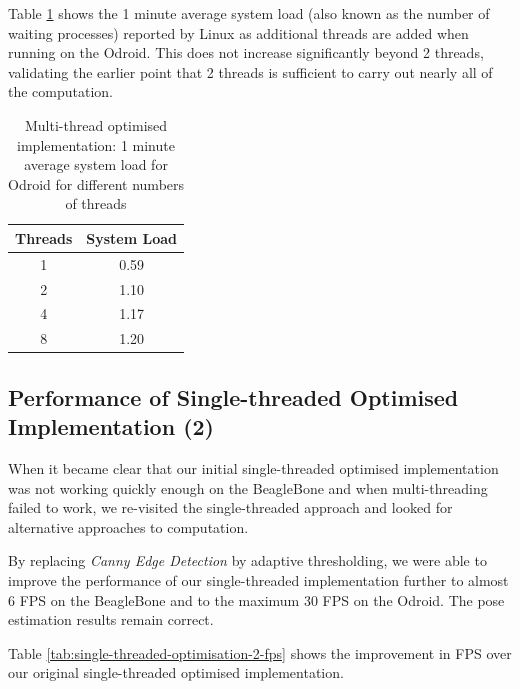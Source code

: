 \documentclass{acm_proc_article-sp}
\begin{document}
\begin{figure}[htbp]
\begin{minipage}{.5\textwidth}
  \label{fig:multi-opt-odroid-fps}
\end{minipage}
\end{figure}

Table \ref{tab:multi-opt-odroid-load} shows the 1 minute average system load (also known as the number of waiting processes) reported by Linux as additional threads are added when running on the Odroid. This does not increase significantly beyond 2 threads, validating the earlier point that 2 threads is sufficient to carry out nearly all of the computation.

\begin{table}[htbp]
  \centering
  
    \begin{tabular}{cc}
    \toprule
    \textbf{Threads} & \textbf{System Load} \\
    \midrule
    1     & 0.59 \\
    2     & 1.10 \\
    4     & 1.17 \\
    8     & 1.20 \\
    \bottomrule
    \end{tabular}%
  \caption{Multi-thread optimised implementation: 1 minute average system load for Odroid for different numbers of threads}
  \label{tab:multi-opt-odroid-load}%
\end{table}%

\subsection{Performance of Single-threaded Optimised Implementation (2)}

When it became clear that our initial single-threaded optimised implementation was not working quickly enough on the BeagleBone and when multi-threading failed to work, we re-visited the single-threaded approach and looked for alternative approaches to computation.

By replacing \textit{Canny Edge Detection} by adaptive thresholding, we were able to improve the performance of our single-threaded implementation further to almost 6 FPS on the BeagleBone and to the maximum 30 FPS on the Odroid. The pose estimation results remain correct.

Table \ref{tab:single-threaded-optimisation-2-fps} shows the improvement in FPS over our original single-threaded optimised implementation.
\end{document}
